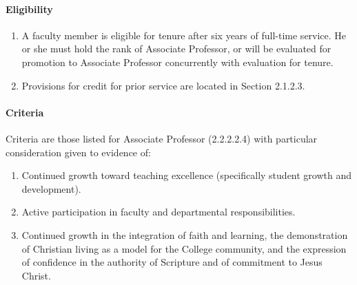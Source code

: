 \documentclass[letterpaper, 11pt]{article}
\begin{document}
			\paragraph{Eligibility}
				\begin{enumerate}[label=\alph*)]
					\item{A faculty member is eligible for tenure after six years of full-time service.  He or she must hold the rank of Associate Professor, or will be evaluated for promotion to Associate Professor concurrently with evaluation for tenure.}
					\item{Provisions for credit for prior service are located in Section 2.1.2.3.}
				\end{enumerate}
			\paragraph{Criteria}
				Criteria are those listed for Associate Professor (2.2.2.2.4) with particular consideration given to evidence of:
				\begin{enumerate}[label=\alph*)]
					\item{Continued growth toward teaching excellence (specifically student growth and development).}
					\item{Active participation in faculty and departmental responsibilities.}
					\item{Continued growth in the integration of faith and learning, the demonstration of Christian living as a model for the College community, and the expression of confidence in the authority of Scripture and of commitment to Jesus Christ.}
				\end{enumerate}
\end{document}
